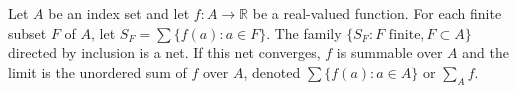 Let $A$ be an index set and let $f : A \to \mathbb{R}$ be a real-valued function. For each finite subset $F$ of $A$, let $S_F = \sum\{f(a) : a \in F\}$. The family $\{S_F : F \text{ finite}, F \subset A\}$ directed by inclusion is a net. If this net converges, $f$ is summable over $A$ and the limit is the unordered sum of $f$ over $A$, denoted $\sum\{f(a) : a \in A\}$ or $\sum_A f$.

